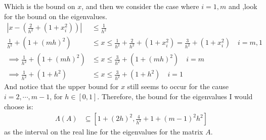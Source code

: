 \documentclass[]{article}
\begin{document}
        Which is the bound on $x$, and then we consider the case where $i = 1, m$ and ,look for the bound on the eigenvalues. 
        \begin{align*}\tag{2.a.5}\label{eqn:2.a.5}
            \left| 
                x - \left(
                    \frac{2}{h^2} + (1 + x_i^2)
                \right) 
            \right| &\le \frac{1}{h^2}
            \\
            \frac{1}{h^2} + (1 + (mh)^2) &\le  x 
            \le     \frac{1}{h^2} + \frac{2}{h^2}
            + (1 + x_i^2)
            = \frac{3}{h^2} + (1 + x_i^2) \quad i = m, 1
            \\\implies
            \frac{1}{h^2} + (1 + (mh)^2) &\le x \le 
            \frac{3}{h^2} + (1 + (mh)^2) \quad i = m
            \\\implies 
            \frac{1}{h^2} + (1 + h^2) &\le x \le 
            \frac{3}{h^2} + (1 + h^2) \quad i = 1
        \end{align*}
        And notice that the upper bound for $x$ still seems to occur for the cause $i = 2, \cdots, m - 1$, for $h\in [0, 1]$. Therefore, the bound for the eigenvalues I would choose is: 
        \begin{align*}\tag{2.a.6}\label{eqn:2.a.6}
            \Lambda(A) &\subseteq
            \left[
                1 + (2h)^2, 
                \frac{4}{h^2} + 1 + (m -1)^2h^2
            \right]
        \end{align*}
        as the interval on the real line for the eigenvalues for the matrix $A$. 
\end{document}

